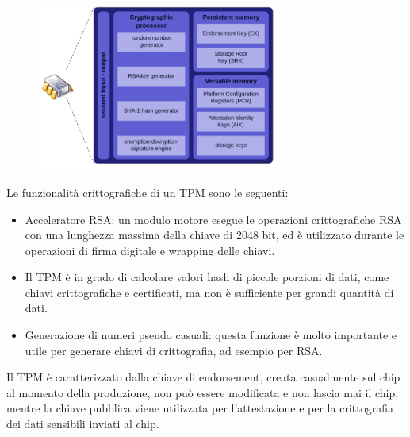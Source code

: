 \begin{figure}[htb!]
    \centering
    \includegraphics[width=8cm]{./Images/cap6/6.4.png}
\end{figure}

Le funzionalità crittografiche di un TPM sono le seguenti:
\begin{itemize}
    \item Acceleratore RSA: un modulo motore esegue le operazioni
crittografiche RSA con una lunghezza massima della chiave
di 2048 bit, ed è utilizzato durante le operazioni di firma
digitale e wrapping delle chiavi.
    \item Il TPM è in grado di calcolare valori hash di piccole porzioni
di dati, come chiavi crittografiche e certificati, ma non è
sufficiente per grandi quantità di dati.
    \item Generazione di numeri pseudo casuali: questa funzione è
molto importante e utile per generare chiavi di crittografia,
ad esempio per RSA.
\end{itemize}
Il TPM è caratterizzato dalla chiave di endorsement, creata
casualmente sul chip al momento della produzione, non può
essere modificata e non lascia mai il chip, mentre la chiave
pubblica viene utilizzata per l'attestazione e per la crittografia dei
dati sensibili inviati al chip.

